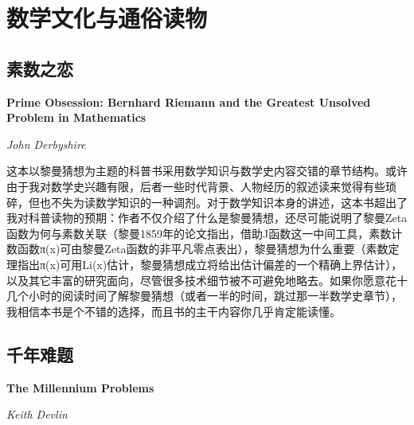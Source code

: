 
\section{数学文化与通俗读物}

\subsection*{素数之恋}
\par \textbf{Prime Obsession: Bernhard Riemann and the Greatest Unsolved Problem in Mathematics}
\par \emph{John Derbyshire}

\par 这本以黎曼猜想为主题的科普书采用数学知识与数学史内容交错的章节结构。或许由于我对数学史兴趣有限，后者一些时代背景、人物经历的叙述读来觉得有些琐碎，但也不失为读数学知识的一种调剂。对于数学知识本身的讲述，这本书超出了我对科普读物的预期：作者不仅介绍了什么是黎曼猜想，还尽可能说明了黎曼Zeta函数为何与素数关联（黎曼1859年的论文指出，借助J函数这一中间工具，素数计数函数π(x)可由黎曼Zeta函数的非平凡零点表出），黎曼猜想为什么重要（素数定理指出π(x)可用Li(x)估计，黎曼猜想成立将给出估计偏差的一个精确上界估计），以及其它丰富的研究面向，尽管很多技术细节被不可避免地略去。如果你愿意花十几个小时的阅读时间了解黎曼猜想（或者一半的时间，跳过那一半数学史章节），我相信本书是个不错的选择，而且书的主干内容你几乎肯定能读懂。
\par {}


\subsection*{千年难题}
\par \textbf{The Millennium Problems}
\par \emph{Keith Devlin}

